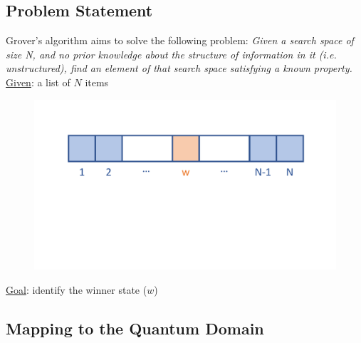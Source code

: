 \documentclass[11pt]{article} %
\begin{document}
\subsection{Problem Statement}
Grover's algorithm aims to solve the following problem:
\newline
\newline
\textit{Given a search space of size N, and no prior knowledge about the structure of information in it (i.e. unstructured), find an element of that search space satisfying a known property.}
\newline
\newline
\underline{Given}: a list of $N$ items
\begin{figure}[h!]
    \centering
    \includegraphics[width=.7\textwidth]{Lecture7Figs/search_items.pdf}
    \label{fig:search_item}
\end{figure}

\noindent\underline{Goal}: identify the winner state ($w$)

\subsection{Mapping to the Quantum Domain}
\end{document}
